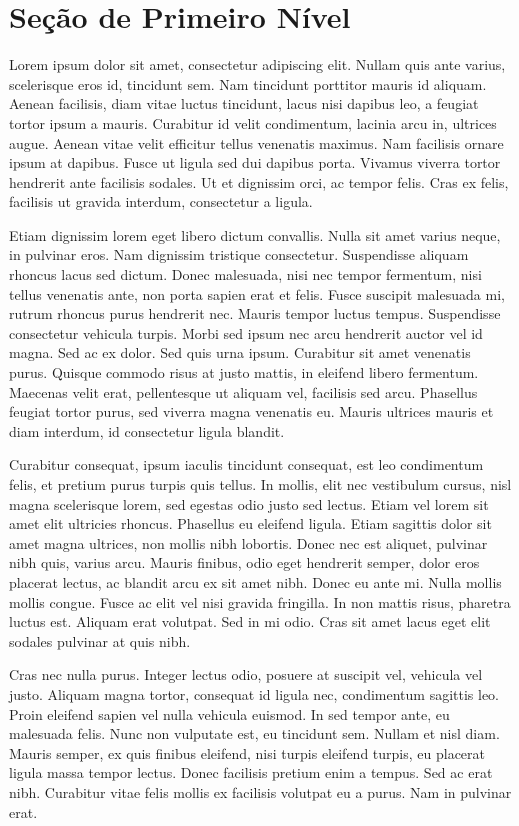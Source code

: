 \chapter{Seção de Primeiro Nível}\label{section:1}

	Lorem ipsum dolor sit amet, consectetur adipiscing elit. Nullam quis ante varius, scelerisque eros id, tincidunt sem. Nam tincidunt porttitor mauris id aliquam. Aenean facilisis, diam vitae luctus tincidunt, lacus nisi dapibus leo, a feugiat tortor ipsum a mauris. Curabitur id velit condimentum, lacinia arcu in, ultrices augue. Aenean vitae velit efficitur tellus venenatis maximus. Nam facilisis ornare ipsum at dapibus. Fusce ut ligula sed dui dapibus porta. Vivamus viverra tortor hendrerit ante facilisis sodales. Ut et dignissim orci, ac tempor felis. Cras ex felis, facilisis ut gravida interdum, consectetur a ligula.

	Etiam dignissim lorem eget libero dictum convallis. Nulla sit amet varius neque, in pulvinar eros. Nam dignissim tristique consectetur. Suspendisse aliquam rhoncus lacus sed dictum. Donec malesuada, nisi nec tempor fermentum, nisi tellus venenatis ante, non porta sapien erat et felis. Fusce suscipit malesuada mi, rutrum rhoncus purus hendrerit nec. Mauris tempor luctus tempus. Suspendisse consectetur vehicula turpis. Morbi sed ipsum nec arcu hendrerit auctor vel id magna. Sed ac ex dolor. Sed quis urna ipsum. Curabitur sit amet venenatis purus. Quisque commodo risus at justo mattis, in eleifend libero fermentum. Maecenas velit erat, pellentesque ut aliquam vel, facilisis sed arcu. Phasellus feugiat tortor purus, sed viverra magna venenatis eu. Mauris ultrices mauris et diam interdum, id consectetur ligula blandit.

	Curabitur consequat, ipsum iaculis tincidunt consequat, est leo condimentum felis, et pretium purus turpis quis tellus. In mollis, elit nec vestibulum cursus, nisl magna scelerisque lorem, sed egestas odio justo sed lectus. Etiam vel lorem sit amet elit ultricies rhoncus. Phasellus eu eleifend ligula. Etiam sagittis dolor sit amet magna ultrices, non mollis nibh lobortis. Donec nec est aliquet, pulvinar nibh quis, varius arcu. Mauris finibus, odio eget hendrerit semper, dolor eros placerat lectus, ac blandit arcu ex sit amet nibh. Donec eu ante mi. Nulla mollis mollis congue. Fusce ac elit vel nisi gravida fringilla. In non mattis risus, pharetra luctus est. Aliquam erat volutpat. Sed in mi odio. Cras sit amet lacus eget elit sodales pulvinar at quis nibh.

	Cras nec nulla purus. Integer lectus odio, posuere at suscipit vel, vehicula vel justo. Aliquam magna tortor, consequat id ligula nec, condimentum sagittis leo. Proin eleifend sapien vel nulla vehicula euismod. In sed tempor ante, eu malesuada felis. Nunc non vulputate est, eu tincidunt sem. Nullam et nisl diam. Mauris semper, ex quis finibus eleifend, nisi turpis eleifend turpis, eu placerat ligula massa tempor lectus. Donec facilisis pretium enim a tempus. Sed ac erat nibh. Curabitur vitae felis mollis ex facilisis volutpat eu a purus. Nam in pulvinar erat.

